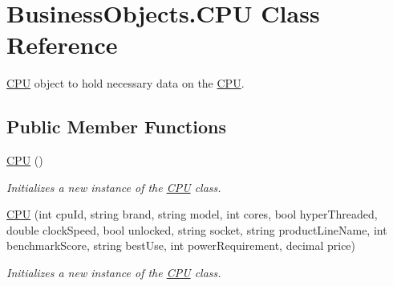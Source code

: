 \hypertarget{class_business_objects_1_1_c_p_u}{}\section{Business\+Objects.\+C\+PU Class Reference}
\label{class_business_objects_1_1_c_p_u}


\hyperlink{class_business_objects_1_1_c_p_u}{C\+PU} object to hold necessary data on the \hyperlink{class_business_objects_1_1_c_p_u}{C\+PU}.  


\subsection*{Public Member Functions}
\begin{DoxyCompactItemize}
\item 
\hyperlink{class_business_objects_1_1_c_p_u_add17fa319f02b438c60fddf8e0d6a787}{C\+PU} ()
\begin{DoxyCompactList}\small\item\em Initializes a new instance of the \hyperlink{class_business_objects_1_1_c_p_u}{C\+PU} class. \end{DoxyCompactList}\item 
\hyperlink{class_business_objects_1_1_c_p_u_a13061cd0fcc98d43aa1d2c2cc63a836f}{C\+PU} (int cpu\+Id, string brand, string model, int cores, bool hyper\+Threaded, double clock\+Speed, bool unlocked, string socket, string product\+Line\+Name, int benchmark\+Score, string best\+Use, int power\+Requirement, decimal price)
\begin{DoxyCompactList}\small\item\em Initializes a new instance of the \hyperlink{class_business_objects_1_1_c_p_u}{C\+PU} class. \end{DoxyCompactList}\end{DoxyCompactItemize}
